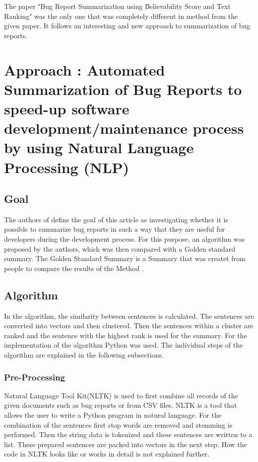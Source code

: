 \documentclass[a4paper,10pt, bibliography=totocnumbered]{scrreprt}
\begin{document}
The paper "Bug Report Summarization using Believability Score and Text Ranking" \cite{koh} was the only one that was completely different in method from the given paper. It follows an interesting and new approach to summarization of bug reports.


\chapter{Approach : Automated Summarization of Bug Reports to speed-up software development/maintenance process by using Natural Language Processing (NLP)}
\label{approach1}

		


\section{Goal}
The authors of \cite{tarar} define the goal of this article as investigating whether it is possible to summarize bug reports in such a way that they are useful for developers during the development process. For this purpose, an algorithm was proposed by the authors, which was then compared with a Golden standard summary. The Golden Standard Summary is a Summary that was createt from people to compare the results of the Method \cite{tarar}.
\section{Algorithm}
In the algorithm, the similarity between sentences is calculated. The sentences are converted into vectors and then clustered. Then the sentences within a cluster are ranked and the sentence with the highest rank is used for the summary. For the implementation of the algorithm Python was used. The individual steps of the algorithm are explained in the following subsections.
\subsection{Pre-Processing}
Natural Language Tool Kit(NLTK) is used to first combine all records of the given documents such as bug reports or from CSV files. NLTK is a tool that allows the user to write a Python program in natural language. For the combination of the sentences first stop words are removed and stemming is performed. Then the string data is tokenized and these sentences are written to a list. These prepared sentences are packed into vectors in the next step. How the code in NLTK looks like or works in detail is not explained further.
\end{document}
